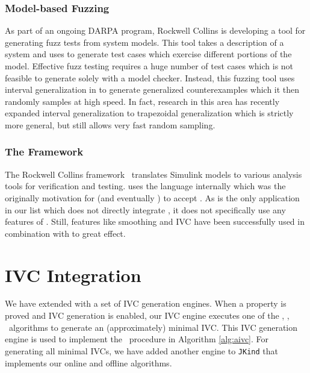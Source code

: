 \subsubsection{Model-based Fuzzing}

As part of an ongoing DARPA program, Rockwell Collins is
developing a tool for generating fuzz tests from system models. This
tool takes a \lustre description of a system and uses \jkind to
generate test cases which exercise different portions of the model.
Effective fuzz testing requires a huge number of test cases which is
not feasible to generate solely with a model checker. Instead, this
fuzzing tool uses interval generalization in \jkind to generate
generalized counterexamples which it then randomly samples at high
speed. In fact, research in this area has recently expanded interval
generalization to trapezoidal generalization which is strictly more
general, but still allows very fast random sampling.


\subsubsection{The \gryphon Framework}

The Rockwell Collins \gryphon
 framework~\cite{miller2010cacm} translates Simulink models to various
 analysis tools for verification and testing. \gryphon uses the \lustre
 language internally which was the originally motivation for \kind
 (and eventually \jkind) to accept \lustre. As \gryphon is the only
 application in our list which does not directly integrate \jkind, it
 does not specifically use any features of \jkind. Still, features like
 smoothing and IVC have been successfully used in combination with
 \gryphon to great effect.

\section{IVC Integration}

We have extended \jkind with a set of IVC generation engines. When a property is
proved and IVC generation is enabled, our IVC engine
executes one of the {\ucalg, \bfalg, \ucbfalg}~algorithms \cite{Ghass16} to generate an (approximately) minimal IVC. This IVC generation engine is used to implement the \getivc\ procedure in  Algorithm \ref{alg:aivc}. For generating all minimal IVCs, we have added another engine to \texttt{JKind} that implements our online and offline algorithms.

